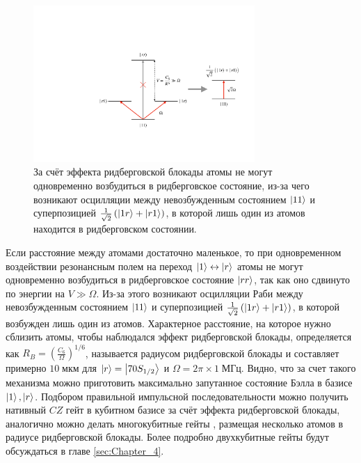 \begin{figure}
	\centering
	\includegraphics[width=0.75\textwidth]{images/rydberg_blockade_scheme.pdf}
	\caption{За счёт эффекта ридберговской блокады атомы не могут одновременно возбудиться в ридберговское состояние, из-за чего возникают осцилляции между невозбужденным состоянием $\left| 11 \right\rangle$ и суперпозицией $\frac{1}{\sqrt{2}}\left(\left| 1r \right\rangle + \left| r1 \right\rangle\right)$, в которой лишь один из атомов находится в ридберговском состоянии.}
	\label{fig:rydberg_blockade}
\end{figure}

Если расстояние между атомами достаточно маленькое, то при одновременном воздействии резонансным полем на переход $\left| 1 \right\rangle\leftrightarrow\left| r \right\rangle$ атомы не могут одновременно возбудиться в ридберговское состояние $\left| rr \right\rangle$, так как оно сдвинуто по энергии на $V \gg \Omega$. Из-за этого возникают осцилляции Раби между невозбужденным состоянием $\left| 11 \right\rangle$ и суперпозицией $\frac{1}{\sqrt{2}}\left(\left| 1r \right\rangle + \left| r1 \right\rangle\right)$, в которой возбужден лишь один из атомов. Характерное расстояние, на которое нужно сблизить атомы, чтобы наблюдался эффект ридберговской блокады, определяется как $R_B = \left(\frac{C_6}{\Omega}\right)^{1/6}$, называется радиусом ридберговской блокады и составляет примерно $10 \;\text{мкм}$ для $\left| r \right\rangle=\left| 70 S_{1/2} \right\rangle$ и $\Omega = 2\pi \times 1 \;\text{МГц}$. Видно, что за счет такого механизма можно приготовить максимально запутанное состояние Бэлла в базисе $\left| 1 \right\rangle, \left| r \right\rangle$. Подбором правильной импульсной последовательности можно получить нативный $CZ$ гейт в кубитном базисе за счёт эффекта ридберговской блокады, аналогично можно делать многокубитные гейты \cite{toffoli}, размещая несколько атомов в радиусе ридберговской блокады. Более подробно двухкубитные гейты будут обсуждаться в главе \ref{sec:Chapter_4}.



